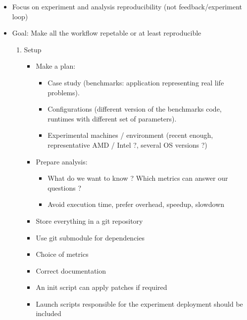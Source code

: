 \begin{itemize}
    \item Focus on experiment and analysis reproducibility (not
        feedback/experiment loop)
    \item Goal: Make all the workflow repetable or at least reproducible
        \begin{enumerate}
            \item Setup
                \begin{itemize}
                    \item Make a plan:
                        \begin{itemize}
                            \item Case study (benchmarks: application representing real life
                                problems).
                            \item Configurations (different version of the benchmarks code,
                                runtimes with different set of parameters).
                            \item Experimental machines / environment (recent enough,
                                representative AMD / Intel ?, several OS versions ?)
                        \end{itemize}
                    \item Prepare analysis:
                        \begin{itemize}
                            \item What do we want to know ? Which metrics can answer our
                                questions ?
                            \item Avoid execution time, prefer overhead, speedup, slowdown
                        \end{itemize}
                    \item Store everything in a git repository
                    \item Use git submodule for dependencies
                    \item Choice of metrics
                    \item Correct documentation
                    \item An init script can apply patches if required
                    \item Launch scripts responsible for the experiment
                        deployment should be included
                \end{itemize}

\end{enumerate}
\end{itemize}
